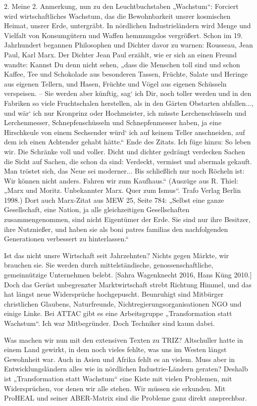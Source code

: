 \documentclass[12pt,a4paper]{article}
\begin{document}
2. Meine 2. Anmerkung, nun zu den Leuchtbuchstaben „Wachstum“: Forciert wird
wirtschaftliches Wachstum, das die Bewohnbarkeit unsrer kosmischen Heimat,
unsrer Erde, untergräbt. In nördlichen Industrieländern wird Menge und
Vielfalt von Konsumgütern und Waffen hemmungslos vergrößert. Schon im
19. Jahrhundert begannen Philosophen und Dichter davor zu warnen: Rousseau,
Jean Paul, Karl Marx. Der Dichter Jean Paul erzählt, wie er sich an einen
Freund wandte: Kannst Du denn nicht sehen, „dass die Menschen toll sind und
schon Kaffee, Tee und Schokolade aus besonderen Tassen, Früchte, Salate und
Heringe aus eigenen Tellern, und Hasen, Früchte und Vögel aus eigenen
Schüsseln verspeisen. – Sie werden aber künftig, sag‘ ich Dir, noch toller
werden und in den Fabriken so viele Fruchtschalen herstellen, als in den
Gärten Obstarten abfallen..., und wär‘ ich nur Kronprinz oder Hochmeister, ich
müsste Lerchenschüsseln und Lerchenmesser, Schnepfenschüsseln und
Schnepfenmesser haben, ja eine Hirschkeule von einem Sechsender würd‘ ich auf
keinem Teller anschneiden, auf dem ich einen Achtender gehabt hätte.“ Ende des
Zitats. Ich füge hinzu: So leben wir. Die Schränke voll und voller. Dicht und
dichter gedrängt verdecken Sachen die Sicht auf Sachen, die schon da sind:
Verdeckt, vermisst und abermals gekauft. Man tröstet sich, das Neue sei
moderner... Bis schließlich nur noch Röcheln ist: Wir können nicht
anders. Fahren wir zum Kaufhaus.“ (Auszüge aus R. Thiel: „Marx und
Moritz. Unbekannter Marx. Quer zum Ismus“. Trafo Verlag Berlin 1998.) Dort
auch Marx-Zitat aus MEW 25, Seite 784: „Selbst eine ganze Gesellschaft, eine
Nation, ja alle gleichzeitigen Gesellschaften zusammengenommen, sind nicht
Eigentümer der Erde. Sie sind nur ihre Besitzer, ihre Nutznießer, und haben
sie als boni patres familias den nachfolgenden Generationen verbessert zu
hinterlassen.“

Ist das nicht unsre Wirtschaft seit Jahrzehnten? Nichts gegen Märkte, wir
brauchen sie. Sie werden durch mittelständische, genossenschaftliche,
gemeinnützige Unternehmen belebt. [Sahra Wagenknecht 2016, Hans Küng 2010.]
Doch das Gerüst unbegrenzter Marktwirtschaft strebt Richtung Himmel, und das
hat längst neue Widersprüche hochgepuscht. Beunruhigt sind Mitbürger
christlichen Glaubens, Naturfreunde, Nichtregierungsorganisationen NGO und
einige Linke. Bei ATTAC gibt es eine Arbeitsgruppe „Transformation statt
Wachstum“. Ich war Mitbegründer. Doch Techniker sind kaum dabei.

Was machen wir nun mit den extensiven Texten zu TRIZ? Altschuller hatte in
einem Land gewirkt, in dem noch vieles fehlte, was uns im Westen längst
Gewohnheit war. Auch in Asien und Afrika fehlt es an vielem. Muss aber in
Entwicklungsländern alles wie in nördlichen Industrie-Ländern geraten?
Deshalb ist „Transformation statt Wachstum“ eine Kiste mit vielen Problemen,
mit Widersprüchen, vor denen wir alle stehen. Wir müssen sie erkunden. Mit
ProHEAL und seiner ABER-Matrix sind die Probleme ganz direkt ansprechbar.
\end{document}
